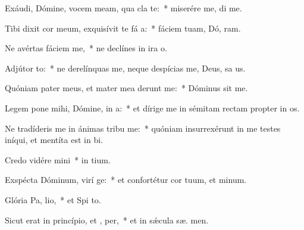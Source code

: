 \item Exáudi, Dómine, vocem meam, qua cla  te:~* miserére me,  di me.
\item Tibi dixit cor meum, exquisívit te fá a:~* fáciem tuam, Dó, ram.
\item Ne avértas fáciem   me,~* ne declínes in ira   o.
\item Adjútor  to:~* ne derelínquas me, neque despícias me, Deus, sa us.
\item Quóniam pater meus, et mater mea derunt me:~* Dóminus  sit me.
\item Legem pone mihi, Dómine, in  a:~* et dírige me in sémitam rectam propter in os.
\item Ne tradíderis me in ánimas tribu me:~* quóniam insurrexérunt in me testes iníqui, et mentíta est in bi.
\item Credo vidére  mini~* in  tium.
\item Exspécta Dóminum, virí ge:~* et confortétur cor tuum, et  minum.
\item Glória Pa,  lio,~* et Spi to.
\item Sicut erat in princípio, et ,  per,~* et in sǽcula sæ. men.
